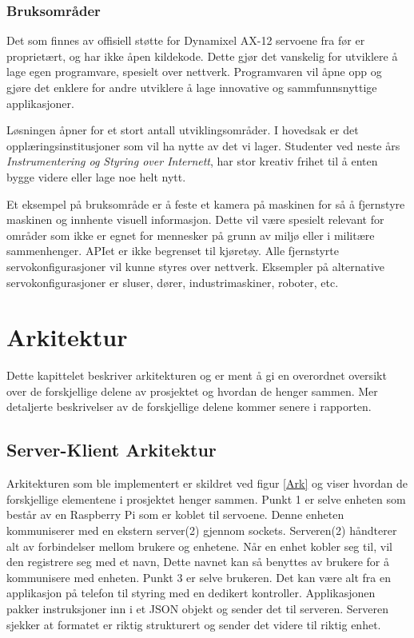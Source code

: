 \documentclass[12pt]{report}
\begin{document}
\subsection{Bruksområder}
Det som finnes av offisiell støtte for Dynamixel AX-12 servoene fra før er proprietært, og har ikke åpen kildekode. Dette gjør det vanskelig for utviklere å lage egen programvare, spesielt over nettverk. Programvaren vil åpne opp og gjøre det enklere for andre utviklere å lage innovative og sammfunnsnyttige applikasjoner. 

Løsningen åpner for et stort antall utviklingsområder. I hovedsak er det opplæringsinstitusjoner som vil ha nytte av det vi lager. Studenter ved neste års \textit{Instrumentering og Styring over Internett}, har stor kreativ frihet til å enten bygge videre eller lage noe helt nytt. 

Et eksempel på bruksområde er å feste et kamera på maskinen for så å fjernstyre maskinen og innhente visuell informasjon. Dette vil være spesielt relevant for områder som ikke er egnet for mennesker på grunn av miljø eller i militære sammenhenger. APIet er ikke begrenset til kjøretøy. Alle fjernstyrte servokonfigurasjoner vil kunne styres over nettverk. Eksempler på alternative servokonfigurasjoner er sluser, dører, industrimaskiner, roboter, etc.


\clearpage

\chapter{Arkitektur}
Dette kapittelet beskriver arkitekturen og er ment å gi en overordnet oversikt over de forskjellige delene av prosjektet og hvordan de henger sammen. Mer detaljerte beskrivelser av de forskjellige delene kommer senere i rapporten.

\section{Server-Klient Arkitektur}
Arkitekturen som ble implementert er skildret ved figur \ref{Ark} og viser hvordan de forskjellige elementene i prosjektet henger sammen. Punkt 1 er selve enheten som består av en Raspberry Pi\cite{Raspberry} som er koblet til servoene. Denne enheten kommuniserer med en ekstern server(2) gjennom sockets\cite{Sockets}. Serveren(2) håndterer alt av forbindelser mellom brukere og enhetene. Når en enhet kobler seg til, vil den registrere seg med et navn, Dette navnet kan så benyttes av brukere for å kommunisere med enheten. Punkt 3 er selve brukeren. Det kan være alt fra en applikasjon på telefon til styring med en dedikert kontroller. Applikasjonen pakker instruksjoner inn i et JSON objekt\cite{JSON} og sender det til serveren. Serveren sjekker at formatet er riktig strukturert og sender det videre til riktig enhet.
\end{document}
